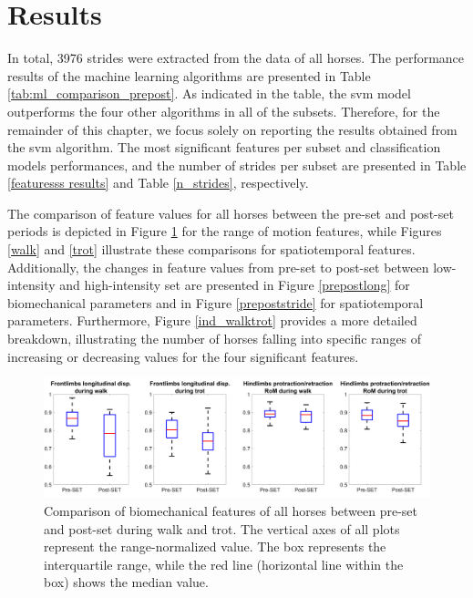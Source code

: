 \section{Results}
\label{sec:results}

In total, 3976 strides were extracted from the data of all horses. The performance results of the machine learning algorithms are presented in Table \ref{tab:ml_comparison_prepost}. As indicated in the table, the \gls{svm} model outperforms the four other algorithms in all of the subsets. Therefore, for the remainder of this chapter, we focus solely on reporting the results obtained from the \gls{svm} algorithm. The most significant features per subset and classification models performances, and the number of strides per subset are presented in Table \ref{featuresss results} and Table \ref{n_strides}, respectively.







The comparison of feature values for all horses between the pre-\gls{set} and post-\gls{set} periods is depicted in Figure \ref{walktrot} for the range of motion features, while Figures \ref{walk} and \ref{trot} illustrate these comparisons for spatiotemporal features. Additionally, the changes in feature values from pre-\gls{set} to post-\gls{set} between low-intensity and high-intensity \gls{set} are presented in Figure \ref{prepostlong} for biomechanical parameters and in Figure \ref{prepoststride} for spatiotemporal parameters. Furthermore, Figure \ref{ind_walktrot} provides a more detailed breakdown, illustrating the number of horses falling into specific ranges of increasing or decreasing values for the four significant features. 

\begin{figure}[htbp]
\centering
\includegraphics[width=.95\linewidth]{chapters/prepost/figures/walktrot_HQ.png}
\caption{Comparison of biomechanical features of all horses between pre-\gls{set} and post-\gls{set} during walk and trot. The vertical axes of all plots represent the range-normalized value. The box represents the interquartile range, while the red line (horizontal line within the box) shows the median value.}
\label{walktrot}
\end{figure}

